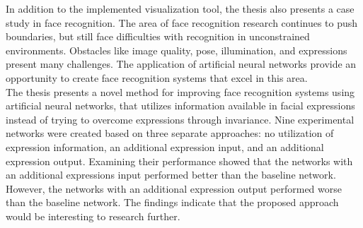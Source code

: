 \noindent In addition to the implemented visualization tool, the thesis also presents a case study in face recognition. The area of face recognition research continues to push boundaries, but still face difficulties with recognition in unconstrained environments. Obstacles like image quality, pose, illumination, and expressions present many challenges. The application of artificial neural networks provide an opportunity to create face recognition systems that excel in this area.\\

\noindent The thesis presents a novel method for improving face recognition systems using artificial neural networks, that utilizes information available in facial expressions instead of trying to overcome expressions through invariance. Nine experimental networks were created based on three separate approaches: no utilization of expression information, an additional expression input, and an additional expression output. Examining their performance showed that the networks with an additional expressions input performed better than the baseline network. However, the networks with an additional expression output performed worse than the baseline network. The findings indicate that the proposed approach would be interesting to research further.

\clearpage
